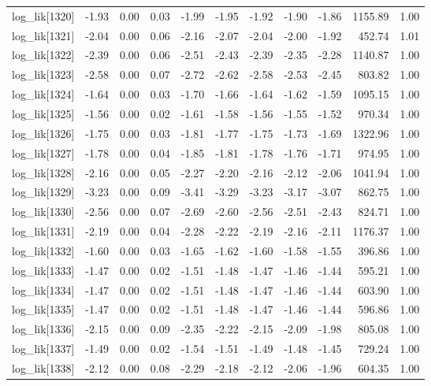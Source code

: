 \begin{table}[ht]
\begin{tabular}{rrrrrrrrrrr}
  log\_lik[1320] & -1.93 & 0.00 & 0.03 & -1.99 & -1.95 & -1.92 & -1.90 & -1.86 & 1155.89 & 1.00 \\ 
  log\_lik[1321] & -2.04 & 0.00 & 0.06 & -2.16 & -2.07 & -2.04 & -2.00 & -1.92 & 452.74 & 1.01 \\ 
  log\_lik[1322] & -2.39 & 0.00 & 0.06 & -2.51 & -2.43 & -2.39 & -2.35 & -2.28 & 1140.87 & 1.00 \\ 
  log\_lik[1323] & -2.58 & 0.00 & 0.07 & -2.72 & -2.62 & -2.58 & -2.53 & -2.45 & 803.82 & 1.00 \\ 
  log\_lik[1324] & -1.64 & 0.00 & 0.03 & -1.70 & -1.66 & -1.64 & -1.62 & -1.59 & 1095.15 & 1.00 \\ 
  log\_lik[1325] & -1.56 & 0.00 & 0.02 & -1.61 & -1.58 & -1.56 & -1.55 & -1.52 & 970.34 & 1.00 \\ 
  log\_lik[1326] & -1.75 & 0.00 & 0.03 & -1.81 & -1.77 & -1.75 & -1.73 & -1.69 & 1322.96 & 1.00 \\ 
  log\_lik[1327] & -1.78 & 0.00 & 0.04 & -1.85 & -1.81 & -1.78 & -1.76 & -1.71 & 974.95 & 1.00 \\ 
  log\_lik[1328] & -2.16 & 0.00 & 0.05 & -2.27 & -2.20 & -2.16 & -2.12 & -2.06 & 1041.94 & 1.00 \\ 
  log\_lik[1329] & -3.23 & 0.00 & 0.09 & -3.41 & -3.29 & -3.23 & -3.17 & -3.07 & 862.75 & 1.00 \\ 
  log\_lik[1330] & -2.56 & 0.00 & 0.07 & -2.69 & -2.60 & -2.56 & -2.51 & -2.43 & 824.71 & 1.00 \\ 
  log\_lik[1331] & -2.19 & 0.00 & 0.04 & -2.28 & -2.22 & -2.19 & -2.16 & -2.11 & 1176.37 & 1.00 \\ 
  log\_lik[1332] & -1.60 & 0.00 & 0.03 & -1.65 & -1.62 & -1.60 & -1.58 & -1.55 & 396.86 & 1.00 \\ 
  log\_lik[1333] & -1.47 & 0.00 & 0.02 & -1.51 & -1.48 & -1.47 & -1.46 & -1.44 & 595.21 & 1.00 \\ 
  log\_lik[1334] & -1.47 & 0.00 & 0.02 & -1.51 & -1.48 & -1.47 & -1.46 & -1.44 & 603.90 & 1.00 \\ 
  log\_lik[1335] & -1.47 & 0.00 & 0.02 & -1.51 & -1.48 & -1.47 & -1.46 & -1.44 & 596.86 & 1.00 \\ 
  log\_lik[1336] & -2.15 & 0.00 & 0.09 & -2.35 & -2.22 & -2.15 & -2.09 & -1.98 & 805.08 & 1.00 \\ 
  log\_lik[1337] & -1.49 & 0.00 & 0.02 & -1.54 & -1.51 & -1.49 & -1.48 & -1.45 & 729.24 & 1.00 \\ 
  log\_lik[1338] & -2.12 & 0.00 & 0.08 & -2.29 & -2.18 & -2.12 & -2.06 & -1.96 & 604.35 & 1.00 \\ 

\end{tabular}
\end{table}
